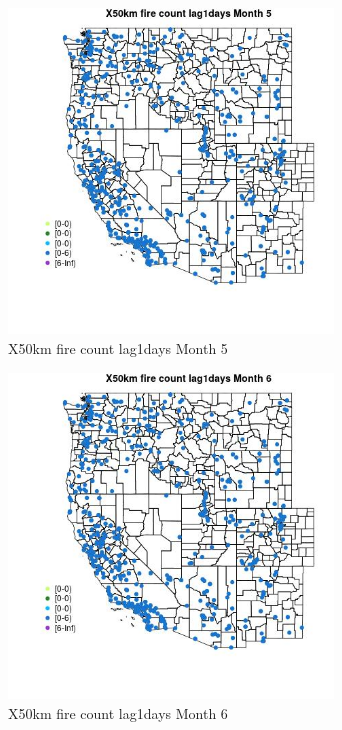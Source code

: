 \begin{figure} 
\centering  
\includegraphics[width=0.77\textwidth]{Code_Outputs/Report_ML_input_PM25_Step4_part_e_de_duplicated_aves_compiled_2019-05-14wNAs_MapObsMo5X50km_fire_count_lag1days.jpg} 
\caption{\label{fig:Report_ML_input_PM25_Step4_part_e_de_duplicated_aves_compiled_2019-05-14wNAsMapObsMo5X50km_fire_count_lag1days}X50km fire count lag1days Month 5} 
\end{figure} 
 

\clearpage 

\begin{figure} 
\centering  
\includegraphics[width=0.77\textwidth]{Code_Outputs/Report_ML_input_PM25_Step4_part_e_de_duplicated_aves_compiled_2019-05-14wNAs_MapObsMo6X50km_fire_count_lag1days.jpg} 
\caption{\label{fig:Report_ML_input_PM25_Step4_part_e_de_duplicated_aves_compiled_2019-05-14wNAsMapObsMo6X50km_fire_count_lag1days}X50km fire count lag1days Month 6} 
\end{figure} 
 

